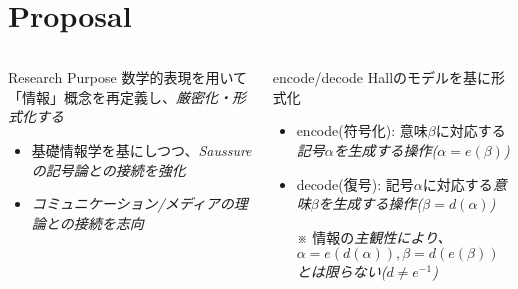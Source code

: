 \section{Proposal}
\begin{columns}[onlytextwidth,t]
\begin{column}{.5\hsize}
\begin{alertblock}{Research Purpose}
数学的表現を用いて\alert{「情報」概念を再定義}し、\em{厳密化}・\em{形式化}する
\begin{itemize}
	\item 基礎情報学を基にしつつ、\em{Saussure}の記号論との接続を強化
	\item \em{コミュニケーション}/\em{メディア}の理論との接続を志向
\end{itemize}
\end{alertblock}
\end{column}
\begin{column}{.47\hsize}
\begin{block}{encode/decode}
Hallのモデル\cite{hall}\cite{hall2}を基に形式化
\begin{itemize}
	\item \alert{encode}(符号化): 意味$\beta$に対応する\em{記号$\alpha$を生成}する操作($\alpha = e(\beta)$)
	\item \alert{decode}(復号): 記号$\alpha$に対応する\em{意味$\beta$を生成}する操作($\beta = d(\alpha)$)
	\item[※] 情報の\em{主観性}により、$\alpha = e(d(\alpha)), \beta = d(e(\beta))$とは限らない($d \neq e^{-1}$)
\end{itemize}
\end{block}
\end{column}
\end{columns}

